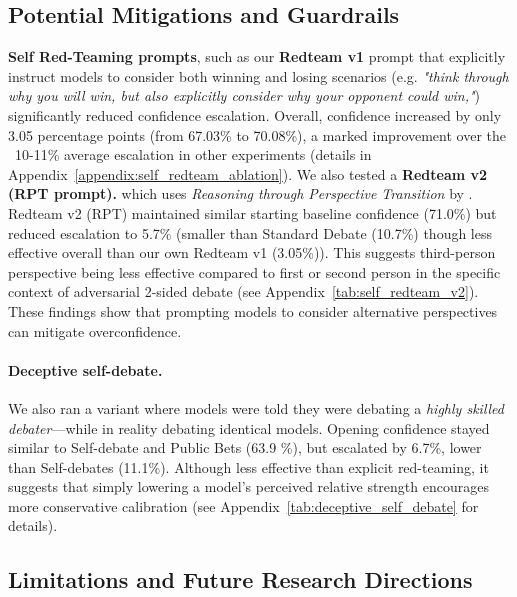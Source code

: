 \documentclass{article}
\begin{document}
\subsection{Potential Mitigations and Guardrails}
\label{subsec:mitigations}
\textbf{Self Red-Teaming prompts}, such as our \textbf{Redteam v1} prompt that explicitly instruct models to consider both winning and losing scenarios (e.g. \textit{"think through why you will win, but also explicitly consider why your opponent could win,"}) significantly reduced confidence escalation. Overall, confidence increased by only 3.05 percentage points (from 67.03\% to 70.08\%), a marked improvement over the ~10-11\% average escalation in other experiments (details in Appendix~\ref{appendix:self_redteam_ablation}). We also tested a \textbf{Redteam v2 (RPT prompt).} which uses \emph{Reasoning through Perspective Transition} by \citet{wang2025perspectivetransitionlargelanguage}. Redteam v2 (RPT) maintained similar starting baseline confidence (71.0\%) but reduced escalation to 5.7\% (smaller than Standard Debate (10.7\%) though less effective overall than our own Redteam v1 (3.05\%)). This suggests third-person perspective being less effective compared to first or second person in the specific context of adversarial 2-sided debate (see Appendix~\ref{tab:self_redteam_v2}). These findings show that prompting models to consider alternative perspectives can mitigate overconfidence.

\paragraph{Deceptive self-debate.} We also ran a variant where models were told they were debating a \emph{highly skilled debater}—while in reality debating identical models. Opening confidence stayed similar to Self-debate and Public Bets (63.9 \%), but escalated by 6.7\%, lower than Self-debates (11.1\%). Although less effective than explicit red-teaming, it suggests that simply lowering a model's perceived relative strength encourages more conservative calibration (see Appendix~\ref{tab:deceptive_self_debate} for details).

\subsection{Limitations and Future Research Directions}
\label{subsec:limitations_future}
\end{document}
